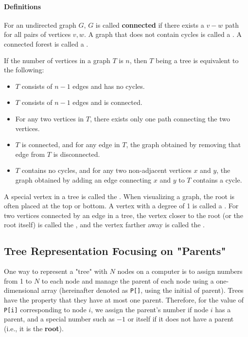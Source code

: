 \paragraph{Definitions}

For an undirected graph $G$, $G$ is called \textbf{connected} if there exists a $v-w$ path for all pairs of vertices $v,w$.
A graph that does not contain cycles is called a .
A connected forest is called a .

If the number of vertices in a graph $T$ is $n$, then $T$ being a tree is equivalent to the following:
\begin{itemize}
\item $T$ consists of $n-1$ edges and has no cycles.
\item $T$ consists of $n-1$ edges and is connected.
\item For any two vertices in $T$, there exists only one path connecting the two vertices.
\item $T$ is connected, and for any edge in $T$, the graph obtained by removing that edge from $T$ is disconnected.
\item $T$ contains no cycles, and for any two non-adjacent vertices $x$ and $y$, the graph obtained by adding an edge connecting $x$ and $y$ to $T$ contains a cycle.
\end{itemize}

A special vertex in a tree is called the .
When visualizing a graph, the root is often placed at the top or bottom. A vertex with a degree of 1 is called a .
For two vertices connected by an edge in a tree, the vertex closer to the root (or the root itself) is called the , and the vertex farther away is called the .
\subsection{Tree Representation Focusing on "Parents"}

One way to represent a "tree" with $N$ nodes on a computer is to assign numbers from 1 to $N$ to each node and manage the parent of each node using a one-dimensional array (hereinafter denoted as \texttt{P[]}, using the initial of parent). Trees have the property that they have at most one parent. Therefore, for the value of \texttt{P[i]} corresponding to node $i$, we assign the parent's number if node $i$ has a parent, and a special number such as $-1$ or itself if it does not have a parent (i.e., it is the \textbf{root}).

